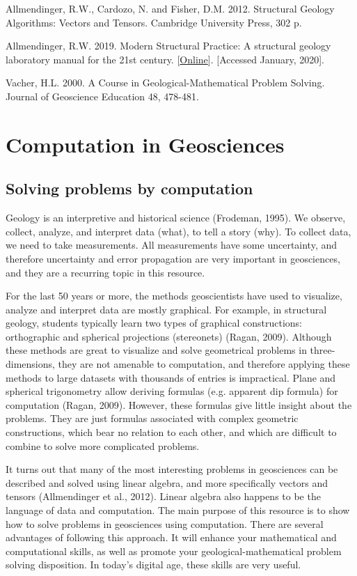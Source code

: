 \documentclass[a4paper , 12pt]{book}
\begin{document}
Allmendinger, R.W., Cardozo, N. and Fisher, D.M. 2012. Structural Geology Algorithms: Vectors and Tensors. Cambridge University Press, 302 p.

Allmendinger, R.W. 2019. Modern Structural Practice: A structural geology laboratory manual for the 21st century. [\href{http://www.geo.cornell.edu/geology/faculty/RWA/structure-lab-manual}{Online}]. [Accessed January, 2020].

Vacher, H.L. 2000. A Course in Geological-Mathematical Problem Solving. Journal of Geoscience Education 48, 478-481.

\tableofcontents

\chapter{Computation in Geosciences}

\section{Solving problems by computation}

Geology is an interpretive and historical science (Frodeman, 1995). We observe, collect, analyze, and interpret data (what), to tell a story (why). To collect data, we need to take measurements. All measurements have some uncertainty, and therefore uncertainty and error propagation are very important in geosciences, and they are a recurring topic in this resource.

For the last 50 years or more, the methods geoscientists have used to visualize, analyze and interpret data are mostly graphical. For example, in structural geology, students typically learn two types of graphical constructions: orthographic and  spherical projections (stereonets) (Ragan, 2009). Although these methods are great to visualize and solve geometrical problems in three-dimensions, they are not amenable to computation, and therefore applying these methods to large datasets with thousands of entries is impractical. Plane and spherical trigonometry allow deriving formulas (e.g. apparent dip formula) for computation (Ragan, 2009). However, these formulas give little insight about the problems. They are just formulas associated with complex geometric constructions, which bear no relation to each other, and which are difficult to combine to solve more complicated problems.

It turns out that many of the most interesting problems in geosciences can be described and solved using linear algebra, and more specifically vectors and tensors (Allmendinger et al., 2012). Linear algebra also happens to be the language of data and computation. The main purpose of this resource is to show how to solve problems in geosciences using computation. There are several advantages of following this approach. It will enhance your mathematical and computational skills, as well as promote your geological-mathematical problem solving disposition. In today’s digital age, these skills are very useful.
\end{document}
